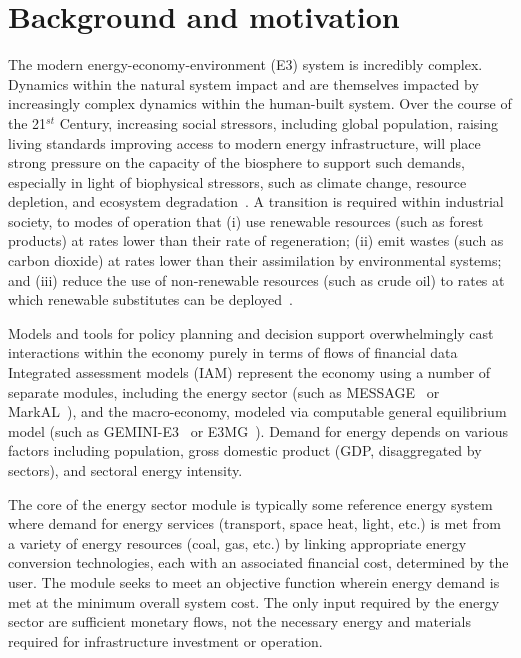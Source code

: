 \documentclass[11pt,a4paper]{article}
\begin{document}

\section{Background and motivation}
\label{sec:back}

The modern energy-economy-environment (E3) system is incredibly complex.
Dynamics within the natural system impact and are themselves impacted by
increasingly complex dynamics within the human-built system.
Over the course of the 21$^{st}$ Century, 
increasing social stressors, including
global population,
raising living standards
improving access to modern energy infrastructure,
will place strong pressure on the capacity of the biosphere
to support such demands,
especially in light of biophysical stressors,
such as climate change,
resource depletion, and
ecosystem degradation~\cite{IPCC2014}.
A transition is required within industrial society,
to modes of operation that
(i) use renewable resources (such as forest products) 
at rates lower than their rate of regeneration;
(ii) emit wastes (such as carbon dioxide) 
at rates lower than their assimilation by environmental systems; and
(iii) reduce the use of non-renewable resources (such as crude oil) 
to rates at which renewable substitutes can be deployed~\cite{Goodland1996, G-R1971}.

Models and tools for policy planning and decision support
overwhelmingly cast interactions within the economy
purely in terms of flows of financial data%
Integrated assessment models (IAM)
represent the economy using a number of separate modules, 
including the energy sector 
(such as MESSAGE~\cite{Messner2000} or MarkAL~\cite{Seebregts2002}), 
and the macro-economy,
modeled via computable general equilibrium model
(such as GEMINI-E3~\cite{Bernard2008} or E3MG~\cite{Kohler2006}). 
Demand for energy depends on various factors including 
population, 
gross domestic product (GDP, disaggregated by sectors), 
and sectoral energy intensity. 

The core of the energy sector module is typically 
some reference energy system where demand for 
energy services (transport, space heat, light, etc.) 
is met from a variety of energy resources (coal, gas, etc.) 
by linking appropriate energy conversion technologies, 
each with an associated financial cost, 
determined by the user. 
The module seeks to meet an objective function 
wherein energy demand is met at the minimum overall system cost. 
The only input required by the energy sector 
are sufficient monetary flows, 
not the necessary energy and materials required for 
infrastructure investment or operation.
\end{document}
